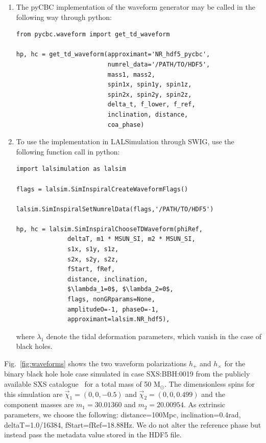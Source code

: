 \documentclass[aps,prd,amssymb,amsmath,amsfonts,superscriptaddress,
floatfix ,preprintnumbers,altaffilletter]{revtex4}
\begin{document}
\begin{enumerate}
  \item The pyCBC implementation of the waveform generator may be called in the following way through python: \\
\begin{lstlisting}
from pycbc.waveform import get_td_waveform 

hp, hc = get_td_waveform(approximant='NR_hdf5_pycbc', 
                         numrel_data='/PATH/TO/HDF5',
                         mass1, mass2,
                         spin1x, spin1y, spin1z,
                         spin2x, spin2y, spin2z, 
                         delta_t, f_lower, f_ref,
                         inclination, distance, 
                         coa_phase)
\end{lstlisting}

\item To use the implementation in LALSimulation through SWIG, use the following function call in python:\\
\begin{lstlisting}[mathescape=true]
import lalsimulation as lalsim

flags = lalsim.SimInspiralCreateWaveformFlags()

lalsim.SimInspiralSetNumrelData(flags,'/PATH/TO/HDF5')

hp, hc = lalsim.SimInspiralChooseTDWaveform(phiRef, 
              deltaT, m1 * MSUN_SI, m2 * MSUN_SI, 
              s1x, s1y, s1z,
              s2x, s2y, s2z, 
              fStart, fRef, 
              distance, inclination,
              $\lambda_1=0$, $\lambda_2=0$, 
              flags, nonGRparams=None, 
              amplitudeO=-1, phaseO=-1, 
              approximant=lalsim.NR_hdf5),
\end{lstlisting}
where $\lambda_1$ denote the tidal deformation parameters, which vanish in the case of black holes. 
\end{enumerate}
Fig.~\ref{fig:waveforms} shows the two waveform polarizations $h_+$ and $h_{\times}$ for the binary black hole hole case simulated in case 
SXS:BBH:0019 from the publicly available SXS catalogue~\cite{Mroue:2013xna} for a total mass of 50 $\mathrm{M}_\odot$. The dimensionless spins for this simulation are
$\vec{\chi}_1=(0,0,-0.5)$ and $\vec{\chi}_2=(0,0,0.499)$ and the component masses are $m_1=30.01360$ and $m_2=20.00954$.
As extrinsic parameters, we choose the following: distance=100Mpc, inclination=0.4rad, deltaT=1.0/16384, fStart=fRef=18.88Hz. We do not alter
the reference phase but instead pass the metadata value stored in the HDF5 file.
\end{document}
